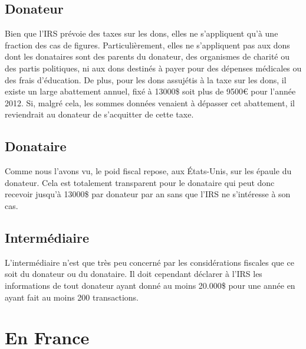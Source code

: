         \subsection{Donateur}
            Bien que l'IRS prévoie des taxes sur les dons, elles ne
            s'appliquent qu'à une fraction des cas de figures.
            Particulièrement, elles ne s'appliquent pas aux dons dont les
            donataires sont des parents du donateur, des organismes de
            charité ou des partis politiques, ni aux dons destinés à payer
            pour des dépenses médicales ou des frais d'éducation.
            De plus, pour les dons assujétis à la taxe sur les dons, il
            existe un large abattement annuel, fixé à 13000\$ soit plus
            de 9500\euro{} pour l'année 2012. Si, malgré cela, les sommes
            données venaient à dépasser cet abattement, il reviendrait au
            donateur de s'acquitter de cette taxe.
        \subsection{Donataire}
            Comme nous l'avons vu, le poid fiscal repose, aux États-Unis,
            sur les épaule du donateur. Cela est totalement transparent
            pour le donataire qui peut donc recevoir jusqu'à 13000\$
            par donateur par an sans que l'IRS ne s'intéresse à son cas.
        \subsection{Intermédiaire}
            L'intermédiaire n'est que très peu concerné par les
            considérations fiscales que ce soit du donateur ou du donataire.
            Il doit cependant déclarer à l'IRS les informations de
            tout donateur ayant donné au moins 20.000\$ pour une année en
            ayant fait au moins 200 transactions.
    \section{En France}
